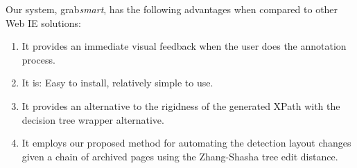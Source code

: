 \documentclass[a4paper,12pt]{nurop}
\begin{document}
Our system, grab\textit{smart}, has the following advantages when compared to other Web IE solutions:
\begin{enumerate}
	\item It provides an immediate visual feedback when the user does the annotation process.
	\item It is: Easy to install, relatively simple to use.
	\item It provides an alternative to the rigidness of the generated XPath with the decision
	tree wrapper alternative.
	\item It employs our proposed method for automating the detection layout changes given
	a chain of archived pages using the Zhang-Shasha tree edit distance.
\end{enumerate}


\end{document}
